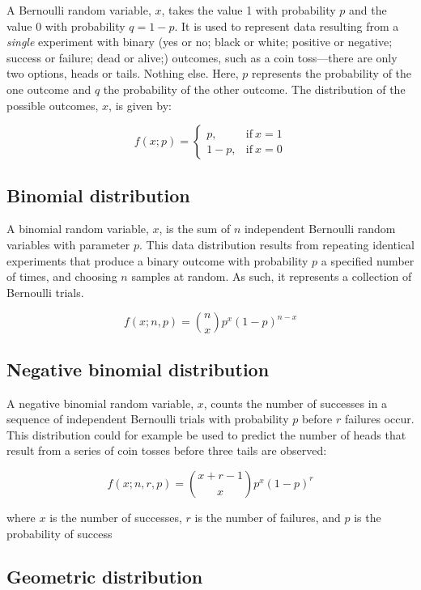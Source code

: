 \documentclass[english,10pt,a4paper,oneside]{book}
\theoremstyle{definition}
\theoremstyle{definition}
\theoremstyle{definition}
\theoremstyle{remark}
\begin{document}
A Bernoulli random variable, \(x\), takes the value 1 with probability
\(p\) and the value 0 with probability \(q=1−p\). It is used to
represent data resulting from a \emph{single} experiment with binary
(yes or no; black or white; positive or negative; success or failure;
dead or alive;) outcomes, such as a coin toss---there are only two
options, heads or tails. Nothing else. Here, \(p\) represents the
probability of the one outcome and \(q\) the probability of the other
outcome. The distribution of the possible outcomes, \(x\), is given by:

\[
f(x;p)=
  \begin{cases}
    p, &\text{if}~x=1\\
    1-p, &\text{if}~x=0
  \end{cases}
\]

\hypertarget{binomial-distribution}{%
\subsection{Binomial distribution}\label{binomial-distribution}}

A binomial random variable, \(x\), is the sum of \(n\) independent
Bernoulli random variables with parameter \(p\). This data distribution
results from repeating identical experiments that produce a binary
outcome with probability \(p\) a specified number of times, and choosing
\(n\) samples at random. As such, it represents a collection of
Bernoulli trials.

\[f(x;n,p)= {n\choose x}p^{x}(1-p)^{n-x}\]

\hypertarget{negative-binomial-distribution}{%
\subsection{Negative binomial
distribution}\label{negative-binomial-distribution}}

A negative binomial random variable, \(x\), counts the number of
successes in a sequence of independent Bernoulli trials with probability
\(p\) before \(r\) failures occur. This distribution could for example
be used to predict the number of heads that result from a series of coin
tosses before three tails are observed:

\[f(x;n,r,p)= {x+r-1\choose x}p^{x}(1-p)^{r}\]

where \(x\) is the number of successes, \(r\) is the number of failures,
and \(p\) is the probability of success

\hypertarget{geometric-distribution}{%
\subsection{Geometric distribution}\label{geometric-distribution}}
\end{document}
